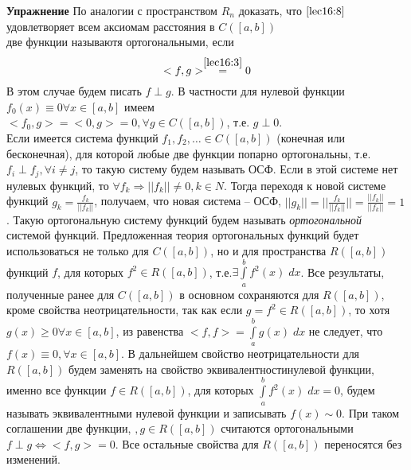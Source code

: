 \documentclass[../../main.tex]{subfiles}
\begin{document}
	\textbf{Упражнение} По аналогии с пространством $R_n$ доказать, что
	 $\eqref{lec16:8}$ удовлетворяет всем аксиомам расстояния в $C(\left[a, b\right])$\\
	две функции называютя ортогональными, если
	\begin{equation} 
	\label{lec16:9}
	<f, g> \stackrel{\eqref{lec16:3}}{=} 0
	\end{equation}
	 В этом случае будем писать $f \perp g$. В частности для нулевой функции $f_0(x)
	  \equiv 0 \forall x \in \left[a, b\right]$ имеем\\
	 $<f_0, g> = <0, g> = 0, \forall g \in C(\left[a, b\right])$, т.е. $g\perp 0$.\\
	 Если имеется система функций $f_1, f_2, \ldots \in  C(\left[a, b\right]) $
	  (конечная или бесконечная), для которой любые две функции попарно ортогональны,
	   т.е. $f_i \perp f_j, \forall i \neq j$, то такую систему будем называть ОСФ.
	    Если в этой системе нет нулевых функций, то $\forall f_k \Rightarrow ||f_k||
	     \neq 0, k \in N $. Тогда переходя к новой системе функций $g_k =
	      \frac{f_k}{||f_k||}$, получаем, что новая система \--- ОСФ, $||g_k|| =
	       ||\frac{f_k}{||f_k||}|| = \frac{||f_k||}{||f_k||} = 1$. Такую ортогональную
	        систему функций будем называть \emph{ортогональной} системой функций.
	 Предложенная теория ортогональных функций будет использоваться не только для
	  $C(\left[a, b\right])$, но и для пространства $R(\left[a, b\right])$ функций $f$,
	  	   для которых $f^2 \in R(\left[a, b\right])$, т.е.$\exists \int\limits_a^b
   		f^2(x)\; dx$. Все результаты, полученные ранее для $C(\left[a, b\right])$ в
	    основном сохраняются для $R(\left[a, b\right])$, кроме свойства
	     неотрицательности, так как  если $g = f^2 \in R(\left[a, b\right])$, то хотя
	     $g(x) \ge 0 \forall x \in \left[a, b\right]$, из равенства $<f,f> =
	     \int\limits_a^b g(x)\; dx$ не следует, что $f(x) \equiv 0, \forall x \in
      \left[a, b\right]$. В дальнейшем свойство неотрицательности для $R(\left[a,
      b\right])$ будем заменять на свойство эквивалентностинулевой функции,   именно
       все функции $f \in R(\left[a, b\right])$, для которых
      $\int\limits_a^b f^2(x)\; dx = 0$, будем называть эквивалентными нулевой
      функции и записывать $f(x) \sim 0$. При таком соглашении две функции, $,
	            g \in R(\left[a, b\right])$ считаются ортогональными $f \perp g
	             \Leftrightarrow <f, g> = 0$. Все остальные свойства для $R(\left[a,
	              b\right])$ переносятся без изменений.
\end{document}
